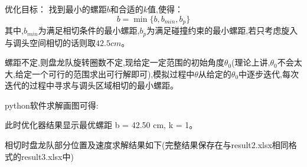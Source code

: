 \noindent 优化目标：
找到最小的螺距$b$和合适的$k$值,使得：
\begin{equation}
	b = \min\{b, b_{min}, b_p\}
\end{equation}
其中,$b_{min}$为满足相切条件的最小螺距,$b_p$为满足碰撞约束的最小螺距,若只考虑旋入与调头空间相切的话则取$42.5cm$。


螺距不定,则盘龙队旋转圈数不定,现给定一定范围的初始角度$\theta_{0}$(理论上讲,$\theta_{0}$不会太大,给定一个可行的范围求出可行解即可),模拟过程中$\theta$从给定的$\theta_{0}$中逐步迭代,每次迭代的过程中寻求与调头区域相切的最小螺距。

python软件求解画图可得:



此时优化器结果显示最优螺距 b = 42.50 cm, k = 1。

相切时盘龙队部分位置及速度求解结果如下(完整结果保存在与result2.xlsx相同格式的result3.xlsx中)

